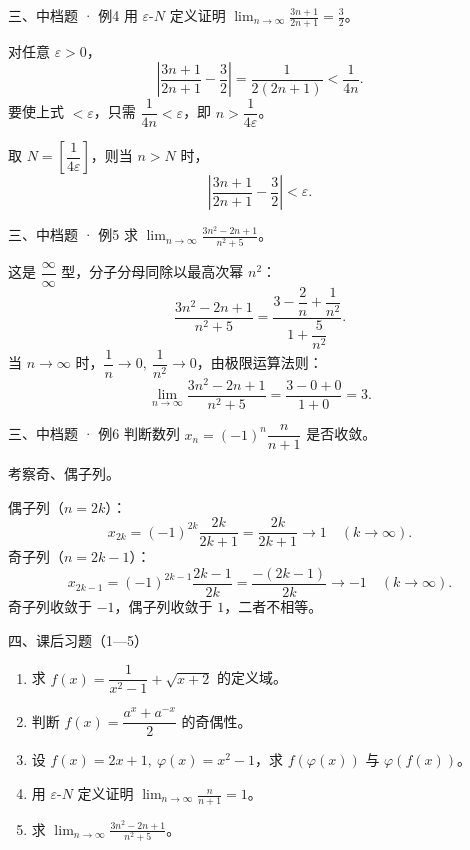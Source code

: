 \documentclass[aspectratio=169,11pt]{beamer}
\begin{document}
\begin{frame}{三、中档题 · 例4}
 用 $\varepsilon$-$N$ 定义证明 $\displaystyle\lim_{n\to\infty}\frac{3n+1}{2n+1}=\frac32$。

 对任意 $\varepsilon>0$，
\[
\left|\frac{3n+1}{2n+1}-\frac32\right|=\frac{1}{2(2n+1)}<\frac{1}{4n}.
\]
要使上式 $<\varepsilon$，只需 $\dfrac{1}{4n}<\varepsilon$，即 $n>\dfrac{1}{4\varepsilon}$。

取 $N=\left[\dfrac{1}{4\varepsilon}\right]$，则当 $n>N$ 时，
\[
\left|\frac{3n+1}{2n+1}-\frac32\right|<\varepsilon.
\]

\end{frame}

\begin{frame}{三、中档题 · 例5}
 求 $\displaystyle\lim_{n\to\infty}\frac{3n^2-2n+1}{n^2+5}$。

 这是 $\dfrac{\infty}{\infty}$ 型，分子分母同除以最高次幂 $n^2$：
\[
\frac{3n^2-2n+1}{n^2+5}=\frac{3-\dfrac2n+\dfrac1{n^2}}{1+\dfrac5{n^2}}.
\]
当 $n\to\infty$ 时，$\dfrac1n\to 0,\ \dfrac1{n^2}\to 0$，由极限运算法则：
\[
\lim_{n\to\infty}\frac{3n^2-2n+1}{n^2+5}=\frac{3-0+0}{1+0}=3.
\]


\end{frame}

\begin{frame}{三、中档题 · 例6}
 判断数列 $x_n=(-1)^n\dfrac{n}{n+1}$ 是否收敛。

 考察奇、偶子列。

偶子列（$n=2k$）：
\[
x_{2k}=(-1)^{2k}\frac{2k}{2k+1}=\frac{2k}{2k+1}\to 1\quad (k\to\infty).
\]
奇子列（$n=2k-1$）：
\[
x_{2k-1}=(-1)^{2k-1}\frac{2k-1}{2k}=\frac{-(2k-1)}{2k}\to -1\quad (k\to\infty).
\]
奇子列收敛于 $-1$，偶子列收敛于 $1$，二者不相等。


\end{frame}

\begin{frame}{四、课后习题（1—5）}
\begin{enumerate}
  \item 求 $f(x)=\dfrac{1}{x^2-1}+\sqrt{x+2}$ 的定义域。
  \item 判断 $f(x)=\dfrac{a^x+a^{-x}}{2}$ 的奇偶性。
  \item 设 $f(x)=2x+1,\ \varphi(x)=x^2-1$，求 $f(\varphi(x))$ 与 $\varphi(f(x))$。
  \item 用 $\varepsilon$-$N$ 定义证明 $\displaystyle\lim_{n\to\infty}\frac{n}{n+1}=1$。
  \item 求 $\displaystyle\lim_{n\to\infty}\frac{3n^2-2n+1}{n^2+5}$。
\end{enumerate}
\end{frame}
\end{document}
